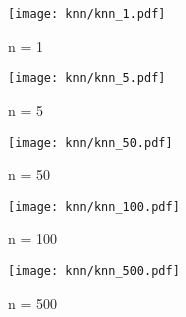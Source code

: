 \documentclass[acmconf,nonacm=true]{acmart}
\begin{document}
\begin{figure}[H]
    \centering
    \texttt{[image: knn/knn\_1.pdf]}
    \caption{n = 1}
\end{figure}

\begin{figure}[H]
    \centering
    \texttt{[image: knn/knn\_5.pdf]}
    \caption{n = 5}
\end{figure}

\begin{figure}[H]
    \centering
    \texttt{[image: knn/knn\_50.pdf]}
    \caption{n = 50}
\end{figure}

\begin{figure}[H]
    \centering
    \texttt{[image: knn/knn\_100.pdf]}
    \caption{n = 100}
\end{figure}

\begin{figure}[H]
    \centering
    \texttt{[image: knn/knn\_500.pdf]}
    \caption{n = 500}
\end{figure}
\end{document}
